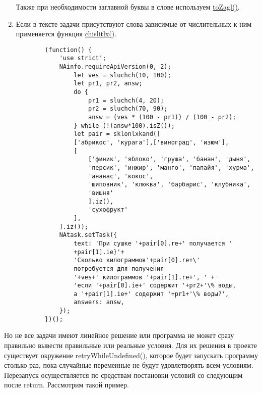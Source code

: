 \begin{enumerate}
          Также при необходимости заглавной буквы в слове используем \hyperlink{toZagl}{toZagl()}.
    \item Если в тексте задачи присутствуют слова зависимые от числительных к ним применяется функция \hyperlink{chislitlx}{chislitlx()}.
          \begin{verbatim}
        (function() {
            'use strict';
            NAinfo.requireApiVersion(0, 2);
                let ves = sluchch(10, 100);
                let pr1, pr2, answ;
                do {
                    pr1 = sluchch(4, 20);
                    pr2 = sluchch(70, 90);
                    answ = (ves * (100 - pr1)) / (100 - pr2);
                } while (!(answ*100).isZ());
                let pair = sklonlxkand([
                ['абрикос', 'курага'],['виноград', 'изюм'],
                [
                    ['финик', 'яблоко', 'груша', 'банан', 'дыня',
                    'персик', 'инжир', 'манго', 'папайя', 'хурма',
                    'ананас', 'кокос',
                    'шиповник', 'клюква', 'барбарис', 'клубника',
                    'вишня'
                    ].iz(),
                    'сухофрукт'
                ],
            ].iz());
            NAtask.setTask({
                text: 'При сушке '+pair[0].re+' получается '
                +pair[1].ie}'+
                'Сколько килограммов'+pair[0].re+\'
                потребуется для получения 
                '+ves+' килограммов '+pair[1].re+', ' +
                'если '+pair[0].ie+' содержит '+pr2+'\% воды, 
                а '+pair[1].ie+' содержит '+pr1+'\% воды?',
                answers: answ,
            });
        })();
        \end{verbatim}
\end{enumerate}
Но не все задачи имеют линейное решение или программа не может сразу правильно вывести правильные или реальные условия.
Для их решения в проекте существует окружение retryWhileUndefined(), которое будет запускать программу столько раз, пока случайные переменные не будут удовлетворять всем условиям.
Перезапуск осуществляется по средствам постановки условий со следующим после return.
Рассмотрим такой пример.

